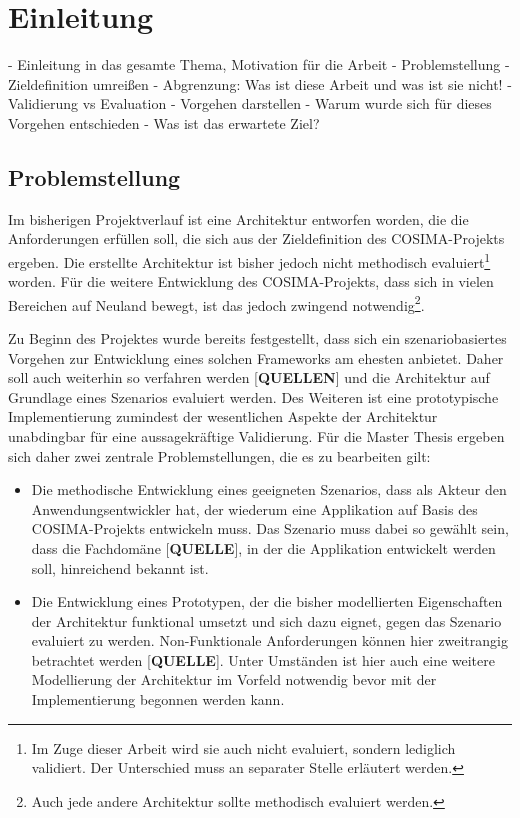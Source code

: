 \chapter{Einleitung} %
\label{cha:einleitung}

- Einleitung in das gesamte Thema, Motivation für die Arbeit
- Problemstellung
- Zieldefinition umreißen
- Abgrenzung: Was ist diese Arbeit und was ist sie nicht!
- Validierung vs Evaluation
- Vorgehen darstellen
- Warum wurde sich für dieses Vorgehen entschieden
- Was ist das erwartete Ziel?

\section{Problemstellung} %
\label{sec:problemstellung}

  Im bisherigen Projektverlauf ist eine Architektur entworfen worden, die die Anforderungen erfüllen soll, die sich aus der Zieldefinition des COSIMA-Projekts ergeben. Die erstellte Architektur ist bisher jedoch nicht methodisch evaluiert\footnote{Im Zuge dieser Arbeit wird sie auch nicht evaluiert, sondern lediglich validiert. Der Unterschied muss an separater Stelle erläutert werden.} worden. Für die weitere Entwicklung des COSIMA-Projekts, dass sich in vielen Bereichen auf Neuland bewegt, ist das jedoch zwingend notwendig\footnote{Auch jede andere Architektur sollte methodisch evaluiert werden.}.
  
  Zu Beginn des Projektes wurde bereits festgestellt, dass sich ein szenariobasiertes Vorgehen zur Entwicklung eines solchen Frameworks am ehesten anbietet. Daher soll auch weiterhin so verfahren werden [\textbf{QUELLEN}] und die Architektur auf Grundlage eines Szenarios evaluiert werden. Des Weiteren ist eine prototypische Implementierung zumindest der wesentlichen Aspekte der Architektur unabdingbar für eine aussagekräftige Validierung. Für die Master Thesis ergeben sich daher zwei zentrale Problemstellungen, die es zu bearbeiten gilt:
  
  \begin{itemize}
    \item Die methodische Entwicklung eines geeigneten Szenarios, dass als Akteur den Anwendungsentwickler hat, der wiederum eine Applikation auf Basis des COSIMA-Projekts entwickeln muss. Das Szenario muss dabei so gewählt sein, dass die Fachdomäne [\textbf{QUELLE}], in der die Applikation entwickelt werden soll, hinreichend bekannt ist.
    \item Die Entwicklung eines Prototypen, der die bisher modellierten Eigenschaften der Architektur funktional umsetzt und sich dazu eignet, gegen das Szenario evaluiert zu werden. Non-Funktionale Anforderungen können hier zweitrangig betrachtet werden [\textbf{QUELLE}]. Unter Umständen ist hier auch eine weitere Modellierung der Architektur im Vorfeld notwendig bevor mit der Implementierung begonnen werden kann.
  \end{itemize}

